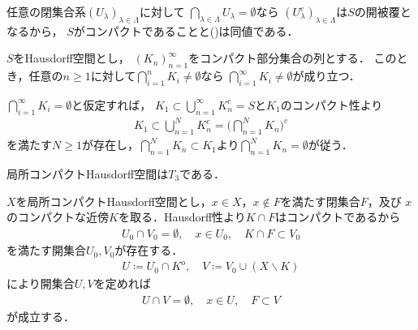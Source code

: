	\begin{prf}
		任意の閉集合系$(U_\lambda)_{\lambda \in \Lambda}$に対して
		$\bigcap_{\lambda \in \Lambda} U_\lambda = \emptyset$なら
		$(U_\lambda^c)_{\lambda \in \Lambda}$は$S$の開被覆となるから，
		$S$がコンパクトであることと()は同値である．
		\QED
	\end{prf}
	
	\begin{screen}
		\begin{thm}[Cantorの共通部分定理]\label{thm:Cantor_intersection_theorem}
			$S$をHausdorff空間とし，
			$(K_n)_{n=1}^\infty$をコンパクト部分集合の列とする．
			このとき，任意の$n \geq 1$に対して$\bigcap_{i=1}^n K_i \neq \emptyset$なら
			$\bigcap_{i=1}^\infty K_i \neq \emptyset$が成り立つ．
		\end{thm}
	\end{screen}
	
	\begin{prf}
		$\bigcap_{i=1}^\infty K_i = \emptyset$と仮定すれば，
		$K_1 \subset \bigcup_{n=1}^\infty K_n^c = S$と$K_1$のコンパクト性より
		\begin{align}
			K_1 \subset \bigcup_{n=1}^N K_n^c = \Biggl( \bigcap_{n=1}^N K_n \Biggr)^c
		\end{align}
		を満たす$N \geq 1$が存在し，$\bigcap_{n=1}^N K_n \subset K_1$より$\bigcap_{n=1}^N K_n = \emptyset$が従う．
		\QED
	\end{prf}
	
	\begin{screen}
		\begin{thm}[局所コンパクトHausdorff空間の正則性]\label{thm:regularity_of_Hausdorff_spaces}
			局所コンパクトHausdorff空間は$T_3$である．
		\end{thm}
	\end{screen}
	
	\begin{prf}
		$X$を局所コンパクトHausdorff空間とし，$x \in X$，$x \notin F$を満たす閉集合$F$，及び
		$x$のコンパクトな近傍$K$を取る．Hausdorff性より$K \cap F$はコンパクトであるから
		\begin{align}
			U_0 \cap V_0 = \emptyset, \quad x \in U_0,  \quad K \cap F \subset V_0
		\end{align}
		を満たす開集合$U_0,V_0$が存在する．
		\begin{align}
			U \coloneqq U_0 \cap K^{\mathrm{o}},
			\quad V \coloneqq V_0 \cup (X \backslash K)
		\end{align}
		により開集合$U,V$を定めれば
		\begin{align}
			U \cap V = \emptyset,
			\quad x \in U,
			\quad F \subset V
		\end{align}
		が成立する．
		\QED
	\end{prf}
	
